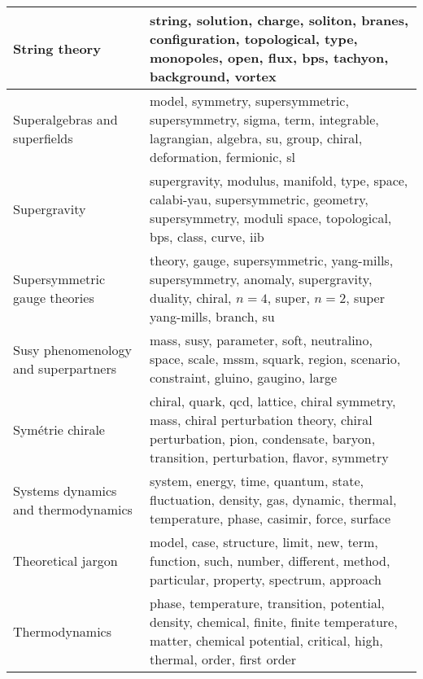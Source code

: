 \begin{longtable}[H]{p{}|p{}}
String theory                                       &                                                                       string, solution, charge, soliton, branes, configuration, topological, type, monopoles, open, flux, bps, tachyon, background, vortex \\ \midrule
Superalgebras and superfields                       &                                                                model, symmetry, supersymmetric, supersymmetry, sigma, term, integrable, lagrangian, algebra, su, group, chiral, deformation, fermionic, sl \\ \midrule
Supergravity                                        &                                                       supergravity, modulus, manifold, type, space, calabi-yau, supersymmetric, geometry, supersymmetry, moduli space, topological, bps, class, curve, iib \\ \midrule
Supersymmetric gauge theories                       &                                                        theory, gauge, supersymmetric, yang-mills, supersymmetry, anomaly, supergravity, duality, chiral, $n=4$, super, $n=2$, super yang-mills, branch, su \\ \midrule
Susy phenomenology and superpartners                &                                                                                  mass, susy, parameter, soft, neutralino, space, scale, mssm, squark, region, scenario, constraint, gluino, gaugino, large \\ \midrule
Symétrie chirale                                    &                                  chiral, quark, qcd, lattice, chiral symmetry, mass, chiral perturbation theory, chiral perturbation, pion, condensate, baryon, transition, perturbation, flavor, symmetry \\ \midrule
Systems dynamics and thermodynamics                 &                                                                             system, energy, time, quantum, state, fluctuation, density, gas, dynamic, thermal, temperature, phase, casimir, force, surface \\ \midrule
Theoretical jargon                                  &                                                                              model, case, structure, limit, new, term, function, such, number, different, method, particular, property, spectrum, approach \\ \midrule
Thermodynamics                                      &                                          phase, temperature, transition, potential, density, chemical, finite, finite temperature, matter, chemical potential, critical, high, thermal, order, first order \\ \midrule

\end{longtable}
